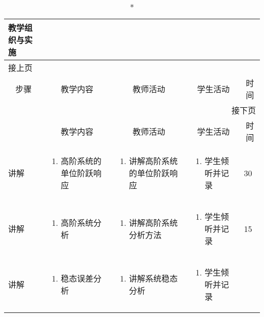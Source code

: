 {%
\begin{landscape}

\begin{longtable}{|m{10mm}|m{50mm}|m{50mm}|m{50mm}|m{15mm}|}
\caption*{\huge 教学组织与实施}\\
\hline
\endfirsthead
\multicolumn{5}{l}{\small 接上页}\\
\hline
\multicolumn{1}{|c|}{步骤}&\multicolumn{1}{c|}{教学内容}&\multicolumn{1}{c|}{教师活动}&\multicolumn{1}{c|}{学生活动}&\multicolumn{1}{c|}{时间}\\
\hline
\endhead

\multicolumn{5}{r}{\small 接下页}\\
\endfoot
\hline
\endlastfoot
\multicolumn{1}{|c|}{步骤}&\multicolumn{1}{c|}{教学内容}&\multicolumn{1}{c|}{教师活动}&\multicolumn{1}{c|}{学生活动}&\multicolumn{1}{c|}{时间}\\\hline
讲解&\begin{enumerate}
\item 高阶系统的单位阶跃响应
\end{enumerate} &\begin{enumerate}
\item 讲解高阶系统的单位阶跃响应
\end{enumerate} &\begin{enumerate}
\item 学生倾听并记录
\end{enumerate} &30 \\\hline
讲解&\begin{enumerate}
\item 高阶系统分析
\end{enumerate}
 &\begin{enumerate}
\item 讲解高阶系统分析方法
\end{enumerate} &\begin{enumerate}
\item 学生倾听并记录
\end{enumerate} &15 \\\hline
讲解&\begin{enumerate}
\item 稳态误差分析
\end{enumerate}
&\begin{enumerate}
\item 讲解系统稳态分析
\end{enumerate} &\begin{enumerate}
\item 学生倾听并记录

\end{enumerate}
\end{longtable}
\end{landscape}}
